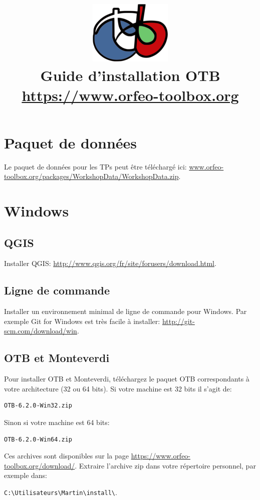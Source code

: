 \documentclass[10pt,a4paper]{article}
\title{\includegraphics[scale=1]{Art/otb-logo.png}\\
  Guide d'installation OTB\\
  {\small\url{https://www.orfeo-toolbox.org}}
}
\begin{document}
\maketitle

\tableofcontents

\clearpage
\section{Paquet de données}

Le paquet de données pour les TPs peut être téléchargé ici: \url{www.orfeo-toolbox.org/packages/WorkshopData/WorkshopData.zip}.

\section{Windows}

\subsection{QGIS}
Installer QGIS: \url{http://www.qgis.org/fr/site/forusers/download.html}.

\subsection{Ligne de commande}
Installer un environnement minimal de ligne de commande pour Windows. Par exemple
Git for Windows est très facile à installer:
\url{http://git-scm.com/download/win}.

\subsection{OTB et Monteverdi}
Pour installer OTB et Monteverdi, téléchargez le paquet OTB correspondants à
votre architecture (32 ou 64 bits). Si votre machine est 32
bits il s'agit de:

\begin{verbatim}
OTB-6.2.0-Win32.zip
\end{verbatim}

Sinon si votre machine est 64 bits:

\begin{verbatim}
OTB-6.2.0-Win64.zip
\end{verbatim}

Ces archives sont disponibles sur la page
\url{https://www.orfeo-toolbox.org/download/}.
Extraire l'archive zip dans votre répertoire personnel, par exemple dans:\\
\begin{centering}
\texttt{C:{\textbackslash}Utilisateurs{\textbackslash}Martin{\textbackslash}install{\textbackslash}}.
\end{centering}
\end{document}
